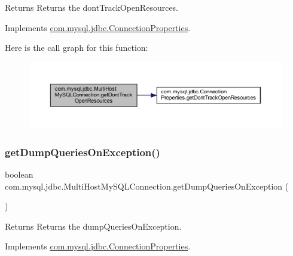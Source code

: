 \begin{DoxyReturn}{Returns}
Returns the dont\+Track\+Open\+Resources. 
\end{DoxyReturn}


Implements \mbox{\hyperlink{interfacecom_1_1mysql_1_1jdbc_1_1_connection_properties_aec0f6158d9bacdc45d430fbddcc93120}{com.\+mysql.\+jdbc.\+Connection\+Properties}}.

Here is the call graph for this function\+:
\nopagebreak
\begin{figure}[H]
\begin{center}
\leavevmode
\includegraphics[width=350pt]{classcom_1_1mysql_1_1jdbc_1_1_multi_host_my_s_q_l_connection_a19be4784393f9abfc6ae0cf6a404af0a_cgraph}
\end{center}
\end{figure}
\mbox{\label{classcom_1_1mysql_1_1jdbc_1_1_multi_host_my_s_q_l_connection_a88ceed8bf1e9e9b2b9d4e524eebb727f}} 
\subsubsection{\texorpdfstring{get\+Dump\+Queries\+On\+Exception()}{getDumpQueriesOnException()}}
{\footnotesize\ttfamily boolean com.\+mysql.\+jdbc.\+Multi\+Host\+My\+S\+Q\+L\+Connection.\+get\+Dump\+Queries\+On\+Exception (\begin{DoxyParamCaption}{ }\end{DoxyParamCaption})}

\begin{DoxyReturn}{Returns}
Returns the dump\+Queries\+On\+Exception. 
\end{DoxyReturn}


Implements \mbox{\hyperlink{interfacecom_1_1mysql_1_1jdbc_1_1_connection_properties_a582cd7a28b4d507bf0e3ceaae3680763}{com.\+mysql.\+jdbc.\+Connection\+Properties}}.

